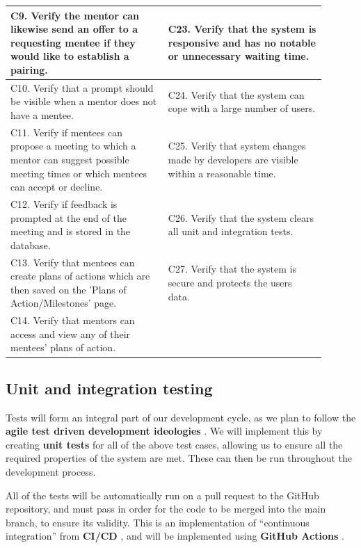 \documentclass[10pt]{article}
\begin{document}
\begin{longtable}{|p{0.45\linewidth}||p{0.45\linewidth}|}
    C9. Verify the mentor can likewise send an offer to a requesting mentee if they would like to establish a pairing.
    &
    C23. Verify that the system is responsive and has no notable or unnecessary waiting time.
    \\ \hline

    C10. Verify that a prompt should be visible when a mentor does not have a mentee.
    &
    C24. Verify that the system can cope with a large number of users.
    \\ \hline

    C11. Verify if mentees can propose a meeting to which a mentor can suggest possible meeting times or which mentees can accept or decline.
    &
    C25. Verify that system changes made by developers are visible within a reasonable time.
    \\ \hline

    C12. Verify if feedback is prompted at the end of the meeting and is stored in the database.
    &
    C26. Verify that the system clears all unit and integration tests.
    \\ \hline

    C13. Verify that mentees can create plans of actions which are then saved on the 'Plans of Action/Milestones' page.
    &
    C27. Verify that the system is secure and protects the users data.
    \\ \hline

    C14. Verify that mentors can access and view any of their mentees' plans of action.
    & \\ \hline

\end{longtable}



\subsection{Unit and integration testing}
Tests will form an integral part of our development cycle, as we plan to follow
the \textbf{agile test driven development ideologies} \cite{tdd}. We will
implement this by creating \textbf{unit tests} for all of the above test cases,
allowing us to ensure all the required properties of the system are met. These
can then be run throughout the development process.

All of the tests will be automatically run on a pull request to the GitHub
repository, and must pass in order for the code to be merged into the main
branch, to ensure its validity. This is an implementation of ``continuous
integration'' from \textbf{CI/CD} \cite{CICD}, and will be implemented using
\textbf{GitHub Actions} \cite{githubActions}.
\end{document}
